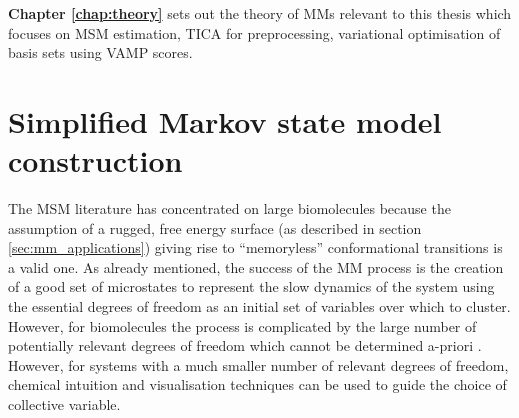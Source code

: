 \textbf{Chapter \ref{chap:theory}} sets out the theory of MMs relevant to this thesis which focuses on MSM estimation, TICA for preprocessing, variational optimisation of basis sets using VAMP scores. 



\section{Simplified Markov state model construction}
 The MSM literature has concentrated on large biomolecules because the assumption of a rugged, free energy surface (as described in section \ref{sec:mm_applications}) giving rise to ``memoryless'' conformational transitions is a valid one. As already mentioned, the success of the MM process is the creation of a good set of microstates to represent the slow dynamics of the system using the essential degrees of freedom as an initial set of variables over which to cluster. However, for biomolecules the process is complicated by the large number of potentially relevant degrees of freedom which cannot be determined a-priori \cite{shallowayMacrostatesClassicalStochastic1996}. However, for systems with a much smaller number of relevant degrees of freedom, chemical intuition and  visualisation techniques can be used to guide the choice of collective variable.

